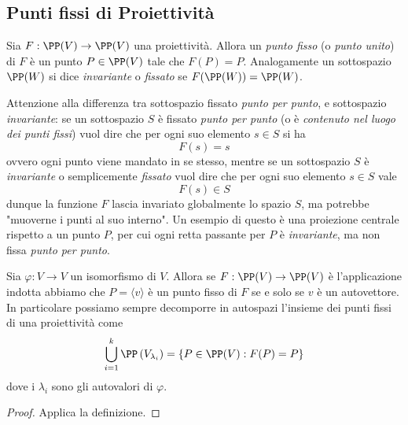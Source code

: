\documentclass[11pt]{scrartcl}
\begin{document}
   	 \newpage
   	 
   	 \subsection{Punti fissi di Proiettività}
   	 \begin{definition}
   	 	Sia $F:\PP(V)\to\PP(V)$ una proiettività. Allora un \textit{punto fisso} (o \textit{punto unito}) di $F$ è un punto $P\in \PP(V)$ tale che $F(P)=P$. Analogamente un sottospazio $\PP(W)$ si dice \textit{invariante} o \textit{fissato} se $F(\PP(W))=\PP(W)$.
   	 \end{definition}
   	 Attenzione alla differenza tra sottospazio fissato \textit{punto per punto}, e sottospazio \textit{invariante}: se un sottospazio $S$ è fissato \textit{punto per punto} (o è \textit{contenuto nel luogo dei punti fissi}) vuol dire che per ogni suo elemento $s\in S$ si ha
   	 $$F(s)=s$$
   	 ovvero ogni punto viene mandato in se stesso, mentre se un sottospazio $S$ è \textit{invariante} o semplicemente \textit{fissato} vuol dire che per ogni suo elemento $s\in S$ vale
   	 $$F(s)\in S$$
   	 dunque la funzione $F$ lascia invariato globalmente lo spazio $S$, ma potrebbe "muoverne i punti al suo interno". Un esempio di questo è una proiezione centrale rispetto a un punto $P$, per cui ogni retta passante per $P$ è \textit{invariante}, ma non fissa \textit{punto per punto}.
   	 \begin{lemma}
   	 	Sia $\varphi:V\to V$ un isomorfismo di $V$. Allora se $F:\PP(V)\to\PP(V)$ è l'applicazione indotta abbiamo che $P=\langle v\rangle$ è un punto fisso di $F$ se e solo se $v$ è un autovettore. In particolare possiamo sempre decomporre in autospazi l'insieme dei punti fissi di una proiettività come
   	 	$$\bigcup_{i=1}^k\PP\left(V_{\lambda_i}\right)=\left\{P\in \PP(V):F(P)=P\right\}$$
   	 	dove i $\lambda_i$ sono gli autovalori di $\varphi$.
   	 \end{lemma}
   	 \begin{proof}
   	 	Applica la definizione.
   	 \end{proof}
\end{document}

